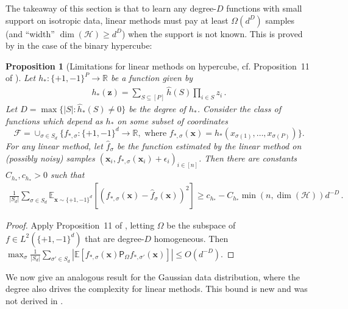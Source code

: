 \documentclass[11pt]{article}
\newcommand{\E}{\mathbb{E}}
\newcommand{\R}{\mathbb{R}}
\newcommand{\<}{\langle}
\renewcommand{\>}{\rangle}
\newtheorem{proposition}{Proposition}
\theoremstyle{definition}
\def\bx{{\boldsymbol x}}
\def\bz{{\boldsymbol z}}
\def\hf{{\hat f}}
\def\cF{{\mathcal F}}
\def\cH{{\mathcal H}}
\def\proj{{\mathsf P}}
\def\proj{{\mathsf P}}
\def\proj{{\mathsf P}}
\def\proj{{\mathsf P}}
\def\bz{{\boldsymbol z}}
\def\proj{{\mathsf P}}
\def\bx{{\boldsymbol x}}
\def\cF{{\mathcal F}}
\def\bz{{\boldsymbol z}}
\def\proj{{\mathsf P}}
\def\hf{\hat f}
\def\cH{\mathcal{H}}
\begin{document}
The takeaway of this section is that to learn any degree-$D$ functions with small support on isotropic data, linear methods must pay at least $\Omega(d^D)$ samples (and ``width'' $\dim(\cH) \geq d^D$) when the support is not known. 
This is proved by \cite{abbe2022merged} in the case of the binary hypercube:
\begin{proposition}[Limitations for linear methods on hypercube, cf. Proposition~11 of \cite{abbe2022merged}]\label{prop:degree-linear-boolean}
Let $h_* : \{+1,-1\}^P \to \R$ be a function given by
\begin{align*}
h_*(\bz) = \sum_{S \subseteq [P]} \hat{h}(S) \prod_{i \in S} z_i\,.
\end{align*}
Let $D = \max \{|S| : \hat{h}_*(S) \neq 0\}$ be the degree of $h_*$.
Consider the class of functions which depend as $h_*$ on some subset of coordinates $$\cF = \cup_{\sigma \in S_d}\{f_{*,\sigma} : \{+1,-1\}^d \to \R, \mbox{ where } f_{*,\sigma}(\bx) = h_*(x_{\sigma(1)},\ldots,x_{\sigma(P)})\}.$$
For any linear method, let $\hf_{\sigma}$ be the function estimated by the linear method on (possibly noisy) samples $(\bx_i,f_{*,\sigma}(\bx_i) + \epsilon_i)_{i \in [n]}$. Then there are constants $C_{h_*},c_{h_*} > 0$ such that
\begin{align*}
\frac{1}{|S_d|} \sum_{\sigma \in S_d} \E_{\bx \sim \{+1,-1\}^d}[(f_{*,\sigma}(\bx) - \hf_{\sigma}(\bx))^2] \geq c_{h_*} - C_{h_*} \min(n,\dim(\cH)) d^{-D}\,.
\end{align*}
\end{proposition}
\begin{proof}
Apply Proposition~11 of \cite{abbe2022merged}, letting $\Omega$ be the subspace of $f \in L^2(\{+1,-1\}^d)$ that are degree-$D$ homogeneous. Then $\max_{\sigma} \frac{1}{|S_d|} \sum_{\sigma' \in S_d} |\E[f_{*,\sigma}(\bx) \proj_{\Omega}f_{*,\sigma'}(\bx)]| \leq O(d^{-D})$.
\end{proof}
We now give an analogous result for the Gaussian data distribution, where the degree also drives the complexity for linear methods. This bound is new and was not derived in \cite{abbe2022merged}.
\end{document}
